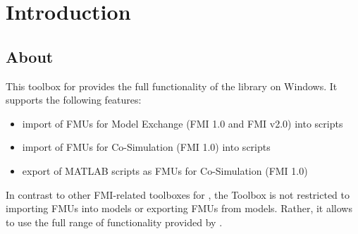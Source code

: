 \chapter{Introduction}


\section{About}

This toolbox for \matlab provides the full functionality of the \fmipp library on Windows.
It supports the following features:
\begin{itemize}
  \item import of FMUs for Model Exchange (FMI 1.0 and FMI v2.0) into \matlab scripts
  \item import of FMUs for Co-Simulation (FMI 1.0) into \matlab scripts
  \item export of MATLAB scripts as FMUs for Co-Simulation (FMI 1.0)
\end{itemize}
In contrast to other FMI-related toolboxes for \matlab, the \fmipp \matlab Toolbox is not restricted to importing FMUs into \simulink models or exporting FMUs from \simulink models.
Rather, it allows to use the full range of functionality provided by \matlab.
